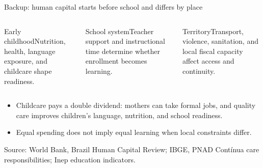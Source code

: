\documentclass[10pt,aspectratio=169]{beamer}
\newcommand{\source}[1]{%
  \par\vfill{\tiny\color{MidGray}Source: #1}}
\begin{document}
\begin{frame}{Backup: human capital starts before school and differs by place}
  \begin{columns}[T,onlytextwidth]
    \begin{block}{Early childhood}Nutrition, health, language exposure, and childcare shape readiness.\end{block}
    \begin{block}{School system}Teacher support and instructional time determine whether enrollment becomes learning.\end{block}
    \begin{block}{Territory}Transport, violence, sanitation, and local fiscal capacity affect access and continuity.\end{block}
  \end{columns}
  \vspace{.45cm}
  \begin{itemize}
    \item Childcare pays a double dividend: mothers can take formal jobs, and quality care improves children's language, nutrition, and school readiness.
    \item Equal spending does not imply equal learning when local constraints differ.
  \end{itemize}
  \source{World Bank, Brazil Human Capital Review; IBGE, PNAD Contínua care responsibilities; Inep education indicators.}
\end{frame}
\end{document}
